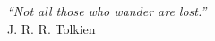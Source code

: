 
\chapter*{}
\vspace{15cm}
\begin{flushright}
	\textit
	{
		“Not all those who wander are lost.”
	}\medskip\\ 
	J. R. R. Tolkien
\end{flushright}
